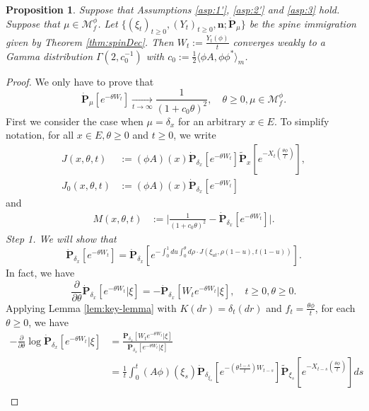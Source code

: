 \documentclass[UTF8]{pkuthss}
\theoremstyle{plain}
\newtheorem{prop}[thm]{Proposition}
\theoremstyle{definition}
\numberwithin{equation}{section}
\begin{document}
\begin{prop}
\label{prop:yaglTheorSpinImmigr}
	Suppose that Assumptions \ref{asp:1'}, \ref{asp:2'}  and \ref{asp:3} hold.
	Suppose that $\mu \in \mathcal M_f^\phi$. Let $\{(\xi_t)_{t\geq 0}, (Y_t)_{t\geq 0}, \mathbf n; \dot {\mathbf P}_\mu\}$ be the spine immigration given by Theorem \ref{thm:spinDec}.
Then $W_t:= \frac{Y_t(\phi)}{t}$ converges weakly to a Gamma distribution
	$\Gamma(2,c_0^{-1})$ with $c_0 := \frac {1} {2} \langle \phi  A, \phi \phi^* \rangle_m$.
\end{prop}
\begin{proof}
We only have to prove that
\[
	\dot{\mathbf P}_\mu[e^{-\theta W_t}]
	\xrightarrow[t\to\infty]{}\frac{1}{(1 + c_0 \theta)^2},
	\quad \theta \geq 0,\mu\in \mathcal M^\phi_f.
\]
 First we consider the case when $\mu = \delta_x$ for an arbitrary $x\in E$.
	To simplify  notation, for all $x\in E,\theta\geq 0$ and $t\geq 0$, we write
\begin{align}
	J(x,\theta,t)
&:=(\phi A)(x)\dot{\mathbf P}_{\delta_{x}}[e^{-\theta W_t}]\widetilde{\mathbf P}_{x}[e^{-X_t(\frac{\theta\phi}{t})}],\\
	J_0(x,\theta,t)
&:=(\phi A)(x)\dot{\mathbf P}_{\delta_x}[e^{-\theta W_t}]
\end{align}
	and
\begin{align}
	M(x,\theta,t)
	&:=\Big|\frac{1}{(1+c_0\theta)^2}-\dot{\mathbf P}_{\delta_x}[e^{-\theta W_t}]\Big|.
\end{align}
	\emph{Step 1.  We will show that}
\begin{equation}\label{eq:yaglTheorSpinImmigrStep1}
	\dot{\mathbf P}_{\delta_x}[e^{-\theta W_t}]
	=\dot{\mathbf P}_{\delta_x}[ e^{-\int_0^1 du\int_0^\theta d\rho\cdot J(\xi_{ut},\rho(1-u),t(1-u))} ].
\end{equation}
	In fact, we have
\[
	\frac{\partial}{\partial \theta}\dot{\mathbf P}_{\delta_x}[e^{-\theta W_t}|\xi]
	= -\dot{\mathbf P}_{\delta_x}[W_te^{-\theta W_t}|\xi],
	\quad t\geq 0,\theta \geq 0.
\]
	Applying Lemma \ref{lem:key-lemma} with $K(dr)=\delta_t(dr)$ and $f_t=\frac{\theta\phi}{t}$, for each $\theta \geq 0$, we have
\begin{align}
	-\frac{\partial}{\partial \theta}\log \dot{\mathbf P}_{\delta_x}[e^{-\theta W_t}|\xi]
	&=\frac{\dot{\mathbf P}_{\delta_x} [W_t e^{-\theta W_t}|\xi]}{\dot{\mathbf P}_{\delta_x}[e^{-\theta W_t}|\xi]}\\
	&=\frac{1}{t}\int_0^t  (A\phi)(\xi_s)\dot{\mathbf P}_{\delta_{\xi_s}}[e^{-(\theta \frac{t-s}{t})W_{t-s}}]\widetilde{\mathbf P}_{\xi_s}[e^{-X_{t-s}(\frac{\theta\phi}{t})}]ds\\

\end{align}
\end{proof}
\end{document}
